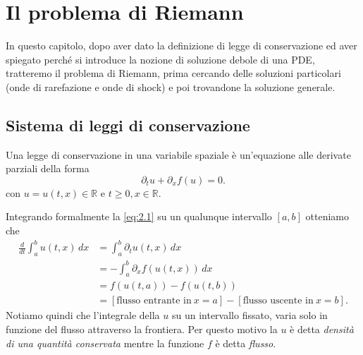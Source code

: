 \chapter{Il problema di Riemann}

In  questo capitolo, dopo aver dato la definizione di legge di conservazione ed aver spiegato perché si introduce la nozione di soluzione debole di una PDE, tratteremo il problema di Riemann, prima cercando delle soluzioni particolari (onde di rarefazione e onde di shock) e poi trovandone la soluzione generale.

\section{Sistema di leggi di conservazione}

\begin{definizione}
    Una legge di conservazione in una variabile spaziale è un'equazione alle derivate parziali della forma
    \begin{equation}\label{eq:2.1}
        \partial_{t}u+\partial_{x}f(u)=0.
    \end{equation}
    con $u = u(t,x)\in\mathbb{R}$ e $t\geq 0, x\in\mathbb{R}$.
\end{definizione}

Integrando formalmente la \eqref{eq:2.1} su un qualunque intervallo $[a, b]$ otteniamo che 
\begin{align} \label{eq:2.2}
    \frac{d}{dt}\int_{a}^{b}u(t,x)\,dx &= \int_{a}^{b}\partial_{t}u(t,x)\,dx \nonumber\\
    &= -\int_{a}^{b}\partial_{x}f(u(t,x))\,dx \nonumber\\
    &= f(u(t,a)) - f(u(t,b)) \nonumber\\
    &= \left[\text{flusso entrante in} \ x=a\right] - \left[\text{flusso uscente in} \ x=b\right].
\end{align}
Notiamo quindi che l'integrale della $u$ su un intervallo fissato, varia solo in funzione del flusso attraverso la frontiera. Per questo motivo la $u$ è detta \textit{densità di una quantità conservata} mentre la funzione $f$ è detta \textit{flusso}.

